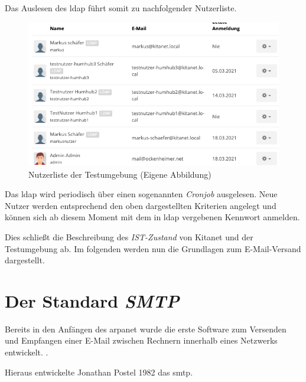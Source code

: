 Das Auslesen des \ac{ldap} führt somit zu nachfolgender Nutzerliste.

\begin{figure}[h]
  \centering
  \includegraphics[width=1.0\textwidth]{res/nutzerliste.png}
  \caption{Nutzerliste der Testumgebung (Eigene Abbildung)}
  \label{fig:Nutzerliste}
\end{figure}

Das \ac{ldap} wird periodisch über einen sogenannten \textit{Cronjob} ausgelesen. Neue Nutzer werden entsprechend den oben dargestellten Kriterien angelegt und können sich ab diesem Moment mit dem in \ac{ldap} vergebenen Kennwort anmelden.

Dies schließt die Beschreibung des \textit{IST-Zustand} von Kitanet und der Testumgebung ab. Im folgenden werden nun die Grundlagen zum E-Mail-Versand dargestellt.

\chapter{Der Standard \textit{SMTP}}

Bereits in den Anfängen des \ac{arpanet} wurde die erste Software zum Versenden und Empfangen einer E-Mail zwischen Rechnern innerhalb eines Netzwerks entwickelt.  \citep[][]{historyinternet}.

Hieraus entwickelte Jonathan Postel 1982 das \acf{smtp}.

